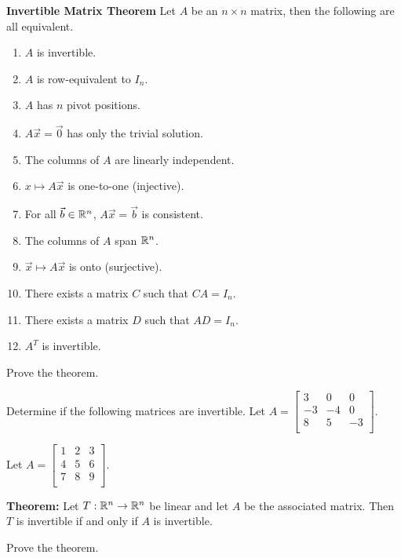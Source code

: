 \documentclass[12pt,letterpaper]{article}
\begin{document}
\begin{enumerate}
{\bf Invertible Matrix Theorem} Let $A$ be an $n \times n$ matrix, then the following are all equivalent.
\begin{enumerate}
\item $A$ is invertible.
\item $A$ is row-equivalent to $I_n$.
\item $A$ has $n$ pivot positions.
\item $A\vec{x}=\vec{0}$ has only the trivial solution.
\item The columns of $A$ are linearly independent.
\item $x\mapsto A\vec{x}$ is one-to-one (injective).
\item For all $\vec{b}\in \mathbb{R}^n$, $A\vec{x}=\vec{b}$ is consistent.
\item The columns of $A$ span $\mathbb{R}^n$.
\item $\vec{x} \mapsto A\vec{x}$ is onto (surjective).
\item There exists a matrix $C$ such that $CA=I_n$.
\item There exists a matrix $D$ such that $AD=I_n$.
\item $A^{T}$ is invertible.
\end{enumerate}

\Problem Prove the theorem.

\newpage

\Problem Determine if the following matrices are invertible.
\Part Let $A=\begin{bmatrix}
3 & 0 & 0\\
-3 &-4 & 0\\
8 & 5 & -3\\
\end{bmatrix}$.

\vfill

\Part Let $A=\begin{bmatrix}
1 &2 & 3\\
4 &5 & 6\\
7 & 8 & 9\\
\end{bmatrix}$.

\vfill

\newpage

{\bf Theorem:} Let $T: \mathbb{R}^n \to \mathbb{R}^n$ be linear and let $A$ be the associated matrix. Then $T$ is invertible if and only if $A$ is invertible.

\Problem Prove the theorem.
 

\end{enumerate}
\end{document}
